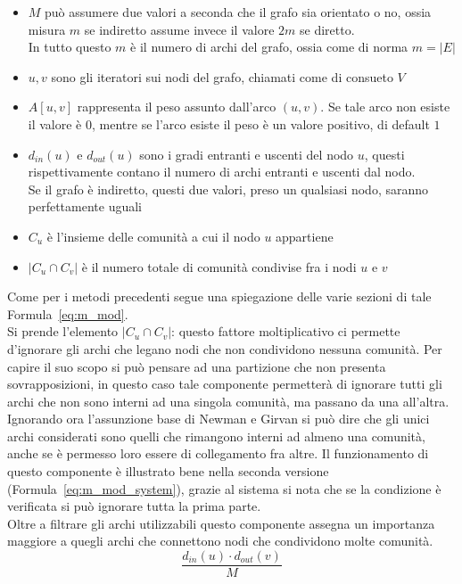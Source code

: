 \begin{itemize}
	\item $M$ può assumere due valori a seconda che il grafo sia orientato o no, ossia misura $m$ se indiretto assume invece il valore $2m$ se diretto.\\
	In tutto questo $m$ è il numero di archi del grafo, ossia come di norma $m=|E|$
	\item $u,v$ sono gli iteratori sui nodi del grafo, chiamati come di consueto $V$
	\item $A \left[ u,v \right]$ rappresenta il peso assunto dall'arco $(u, v)$. Se tale arco non esiste il valore è $0$, mentre se l'arco esiste il peso è un valore positivo, di default $1$
	\item $d_{in}\left(u\right)$ e $d_{out}\left(u\right)$ sono i gradi entranti e uscenti del nodo $u$, questi rispettivamente contano il numero di archi entranti e uscenti dal nodo.\\
	Se il grafo è indiretto, questi due valori, preso un qualsiasi nodo, saranno perfettamente uguali
	\item $C_u$ è l'insieme delle comunità a cui il nodo $u$ appartiene
	\item $|C_u \cap C_v|$ è il numero totale di comunità condivise fra i nodi $u$ e $v$
\end{itemize}
%
Come per i metodi precedenti segue una spiegazione delle varie sezioni di tale Formula~\ref{eq:m_mod}.\\
Si prende l'elemento $ |C_u \cap C_v|$: questo fattore moltiplicativo ci permette d'ignorare gli archi che legano nodi che non condividono nessuna comunità. Per capire il suo scopo si può pensare ad una partizione che non presenta sovrapposizioni, in questo caso tale componente permetterà di ignorare tutti gli archi che non sono interni ad una singola comunità, ma passano da una all'altra. Ignorando ora l'assunzione base di Newman e Girvan  si può dire che gli unici archi considerati sono quelli che rimangono interni ad almeno una comunità, anche se è permesso loro essere di collegamento fra altre. Il funzionamento di questo componente è illustrato bene nella seconda versione (Formula~\ref{eq:m_mod_system}), grazie al sistema si nota che se la condizione è verificata si può ignorare tutta la prima parte.\\
Oltre a filtrare gli archi utilizzabili questo componente assegna un importanza maggiore a quegli archi che connettono nodi che condividono molte comunità.
\begin{equation}
	\frac{ d_{in}\left(u\right) \cdot d_{out}\left(v\right) }{M}
	\label{eq:d_in-out}
\end{equation}
